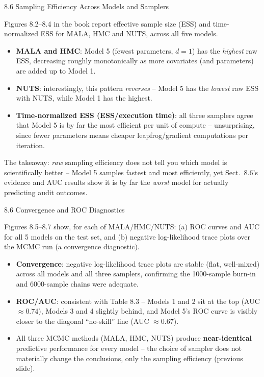 \documentclass[aspectratio=169,10pt]{beamer}
\begin{document}
\begin{frame}[allowframebreaks]{8.6 Sampling Efficiency Across Models and Samplers}

Figures 8.2--8.4 in the book report effective sample size (ESS) and time-normalized ESS for MALA, HMC and NUTS, across all five models.

\begin{itemize}
  \item \textbf{MALA and HMC}: Model 5 (fewest parameters, $d=1$) has the \emph{highest} raw ESS, decreasing roughly monotonically as more covariates (and parameters) are added up to Model 1.
  \item \textbf{NUTS}: interestingly, this pattern \emph{reverses} -- Model 5 has the \emph{lowest} raw ESS with NUTS, while Model 1 has the highest.
  \item \textbf{Time-normalized ESS (ESS/execution time)}: all three samplers agree that Model 5 is by far the most efficient per unit of compute -- unsurprising, since fewer parameters means cheaper leapfrog/gradient computations per iteration.
\end{itemize}

The takeaway: \emph{raw} sampling efficiency does not tell you which model is scientifically better -- Model 5 samples fastest and most efficiently, yet Sect.\ 8.6's evidence and AUC results show it is by far the \emph{worst} model for actually predicting audit outcomes.

\end{frame}

\begin{frame}[allowframebreaks]{8.6 Convergence and ROC Diagnostics}

Figures 8.5--8.7 show, for each of MALA/HMC/NUTS: (a) ROC curves and AUC for all 5 models on the test set, and (b) negative log-likelihood trace plots over the MCMC run (a convergence diagnostic).

\begin{itemize}
  \item \textbf{Convergence}: negative log-likelihood trace plots are stable (flat, well-mixed) across all models and all three samplers, confirming the 1000-sample burn-in and 6000-sample chains were adequate.
  \item \textbf{ROC/AUC}: consistent with Table 8.3 -- Models 1 and 2 sit at the top (AUC $\approx 0.74$), Models 3 and 4 slightly behind, and Model 5's ROC curve is visibly closer to the diagonal ``no-skill'' line (AUC $\approx 0.67$).
  \item All three MCMC methods (MALA, HMC, NUTS) produce \textbf{near-identical} predictive performance for every model -- the choice of sampler does not materially change the conclusions, only the sampling efficiency (previous slide).
\end{itemize}

\end{frame}
\end{document}
